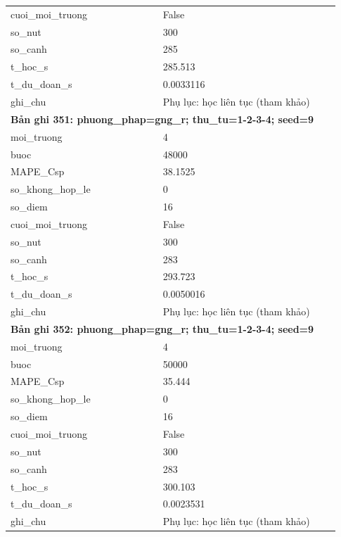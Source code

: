 \begin{longtable}{p{0.43\linewidth}p{0.50\linewidth}}
cuoi\_\allowbreak moi\_\allowbreak truong & False \\
so\_\allowbreak nut & 300 \\
so\_\allowbreak canh & 285 \\
t\_\allowbreak hoc\_\allowbreak s & 285.513 \\
t\_\allowbreak du\_\allowbreak doan\_\allowbreak s & 0.0033116 \\
ghi\_\allowbreak chu & Phụ lục: học liên tục (tham khảo) \\
\midrule
\multicolumn{2}{p{0.95\linewidth}}{\textbf{Bản ghi 351: phuong\_phap=gng\_r; thu\_tu=1-2-3-4; seed=9}} \\
moi\_\allowbreak truong & 4 \\
buoc & 48000 \\
MAPE\_\allowbreak Csp & 38.1525 \\
so\_\allowbreak khong\_\allowbreak hop\_\allowbreak le & 0 \\
so\_\allowbreak diem & 16 \\
cuoi\_\allowbreak moi\_\allowbreak truong & False \\
so\_\allowbreak nut & 300 \\
so\_\allowbreak canh & 283 \\
t\_\allowbreak hoc\_\allowbreak s & 293.723 \\
t\_\allowbreak du\_\allowbreak doan\_\allowbreak s & 0.0050016 \\
ghi\_\allowbreak chu & Phụ lục: học liên tục (tham khảo) \\
\midrule
\multicolumn{2}{p{0.95\linewidth}}{\textbf{Bản ghi 352: phuong\_phap=gng\_r; thu\_tu=1-2-3-4; seed=9}} \\
moi\_\allowbreak truong & 4 \\
buoc & 50000 \\
MAPE\_\allowbreak Csp & 35.444 \\
so\_\allowbreak khong\_\allowbreak hop\_\allowbreak le & 0 \\
so\_\allowbreak diem & 16 \\
cuoi\_\allowbreak moi\_\allowbreak truong & False \\
so\_\allowbreak nut & 300 \\
so\_\allowbreak canh & 283 \\
t\_\allowbreak hoc\_\allowbreak s & 300.103 \\
t\_\allowbreak du\_\allowbreak doan\_\allowbreak s & 0.0023531 \\
ghi\_\allowbreak chu & Phụ lục: học liên tục (tham khảo) \\

\end{longtable}
